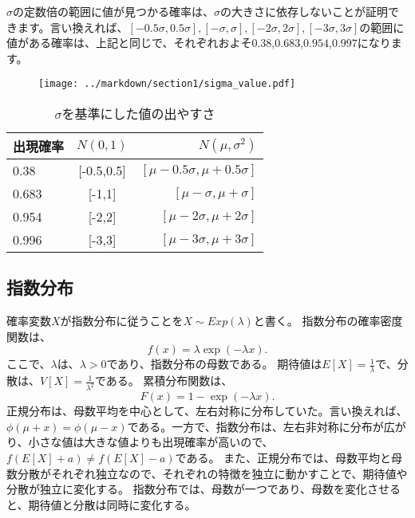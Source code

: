 \documentclass[a4paper,11pt,dvipdfmx]{jsarticle}
\begin{document}
$\sigma$の定数倍の範囲に値が見つかる確率は、$\sigma$の大きさに依存しないことが証明できます。言い換えれば、$[-0.5\sigma,0.5\sigma],[-\sigma,\sigma],[-2\sigma,2\sigma],[-3\sigma,3\sigma]$の範囲に値がある確率は、上記と同じで、それぞれおよそ$0.38$,$0.683$,$0.954$,$0.997$になります。


\begin{figure}
    \begin{center}
        \texttt{[image: ../markdown/section1/sigma\_value.pdf]}
        \label{fig:sigma_interval_probability}
      \end{center}
\end{figure}

\begin{table}[hbtp]
    \caption{$\sigma$を基準にした値の出やすさ}
    \centering
    \begin{tabular}{lcr}
        \hline
        出現確率  & $N(0,1)$  &  $N(\mu,\sigma^2)$ \\
        \hline \hline
        0.38 & [-0.5,0.5]  & $[\mu-0.5\sigma,\mu+0.5\sigma]$ \\
        0.683 & [-1,1] & $[\mu-\sigma,\mu+\sigma]$\\
        0.954 & [-2,2] & $[\mu-2\sigma,\mu+2\sigma]$\\
        0.996 & [-3,3] & $[\mu-3\sigma,\mu+3\sigma]$\\
    \end{tabular}
\end{table}




\subsection{指数分布}
確率変数$X$が指数分布に従うことを$X \sim Exp(\lambda)$と書く。
指数分布の確率密度関数は、
\begin{equation*}
    f(x)=\lambda \exp(-\lambda x).
\end{equation*}
ここで、$\lambda$は、$\lambda>0$であり、指数分布の母数である。
期待値は$E[X]=\frac{1}{\lambda}$で、分散は、$V[X]=\frac{1}{\lambda^2}$である。
累積分布関数は、
\begin{equation*}
    F(x)=1-\exp(-\lambda x).
\end{equation*}
正規分布は、母数平均を中心として、左右対称に分布していた。言い換えれば、$\phi(\mu+x)=\phi(\mu-x)$である。一方で、指数分布は、左右非対称に分布が広がり、小さな値は大きな値よりも出現確率が高いので、$f(E[X]+a)\neq f(E[X]-a)$である。
また、正規分布では、母数平均と母数分散がそれぞれ独立なので、それぞれの特徴を独立に動かすことで、期待値や分散が独立に変化する。
指数分布では、母数が一つであり、母数を変化させると、期待値と分散は同時に変化する。
\end{document}
